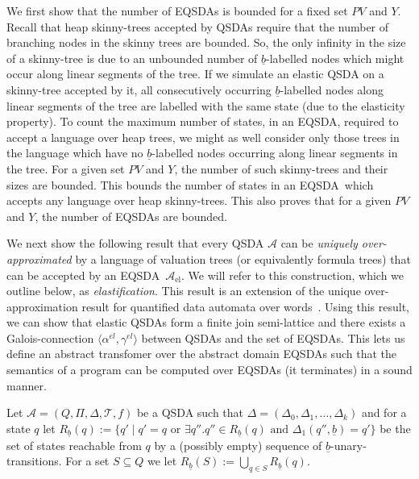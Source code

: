 \documentclass{llncs}
\newcommand{\tuple}[1]{\langle #1 \rangle}
\newcommand{\A}{\mathcal{A}}
\newcommand{\AEL}{\A_\text{el}}
\newcommand{\blank}{\underline{b}}
\newcommand{\PV}{\mathit{PV}}
\newcommand{\EQSDA}{\mbox{\sc EQSDA}}
\begin{document}
We first show that the number of \EQSDA s is bounded for a fixed set $\PV$ and $Y$.
Recall that heap skinny-trees accepted by QSDAs require that the number of branching nodes in the skinny trees are bounded. So, the only infinity in the size of a skinny-tree is due to an unbounded number of $\blank$-labelled nodes which might occur along linear segments of the tree.
If we simulate an elastic QSDA on a skinny-tree accepted by it, all consecutively occurring $\blank$-labelled nodes along linear segments of the tree are labelled with the same state (due to the elasticity property).
To count the maximum number of states, in an \EQSDA, required to accept a language over heap trees, we might as well consider only those trees in the language which have no $\blank$-labelled nodes occurring along linear segments in the tree. For a given set $\PV$ and $Y$, the number of such skinny-trees and their sizes are bounded. This bounds the number of states in an \EQSDA\ which accepts any language over heap skinny-trees. This also proves that for a given $\PV$ and $Y$, the number of \EQSDA s are bounded.



We next show the  following
result that every QSDA $\A$ can be \emph{uniquely over-approximated}
by a language of valuation trees (or equivalently formula trees) that can be
accepted by an \EQSDA\ $\AEL$.
We will refer to this construction, which we outline below, as \emph{elastification}.
This result is an extension of the unique over-approximation result for quantified data automata over words~\cite{CAVQDA}.
Using this result, we can show that elastic QSDAs form a finite join semi-lattice and there exists a Galois-connection  $\tuple{\alpha^{el}, \gamma^{el}}$
between QSDAs and the set of \EQSDA s.
This lets us define an abstract transfomer over the abstract domain \EQSDA s such that the semantics of a program can be computed over \EQSDA s (it terminates)
in a sound  manner.

Let $\A = (Q, \Pi, \Delta, \mathcal{T}, f)$ be a QSDA  such that $\Delta = (\Delta_0, \Delta_1, \ldots, \Delta_k)$ and for a state $q$ let
$R_{\blank}(q):= \{q' \mid q' = q \text{ or } \exists q''. q'' \in R_{\blank}(q) \text{ and } \Delta_1(q'', \blank) = q' \}$
be the set of states reachable from $q$ by a (possibly empty) sequence
of $\blank$-unary-transitions.  For a set $S \subseteq Q$ we let
$R_{\blank}(S) := \bigcup_{q \in S} R_{\blank}(q)$.
\end{document}
